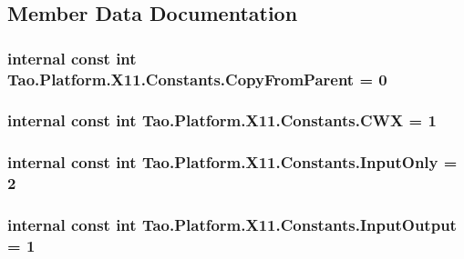 \subsection{Member Data Documentation}
\hypertarget{struct_tao_1_1_platform_1_1_x11_1_1_constants_a05696b30cac01cc03774c5524e23cbfd}{
\subsubsection[{CopyFromParent}]{\setlength{\rightskip}{0pt plus 5cm}internal const int {\bf Tao.Platform.X11.Constants.CopyFromParent} = 0}}
\label{struct_tao_1_1_platform_1_1_x11_1_1_constants_a05696b30cac01cc03774c5524e23cbfd}
\hypertarget{struct_tao_1_1_platform_1_1_x11_1_1_constants_ad50b8f27e32c5c2eabb8f13203dab933}{
\subsubsection[{CWX}]{\setlength{\rightskip}{0pt plus 5cm}internal const int {\bf Tao.Platform.X11.Constants.CWX} = 1}}
\label{struct_tao_1_1_platform_1_1_x11_1_1_constants_ad50b8f27e32c5c2eabb8f13203dab933}
\hypertarget{struct_tao_1_1_platform_1_1_x11_1_1_constants_a6d5fc4dd7bae2fd683224655b3a076e7}{
\subsubsection[{InputOnly}]{\setlength{\rightskip}{0pt plus 5cm}internal const int {\bf Tao.Platform.X11.Constants.InputOnly} = 2}}
\label{struct_tao_1_1_platform_1_1_x11_1_1_constants_a6d5fc4dd7bae2fd683224655b3a076e7}
\hypertarget{struct_tao_1_1_platform_1_1_x11_1_1_constants_a6f3227d40d1193df46290e2551acf852}{
\subsubsection[{InputOutput}]{\setlength{\rightskip}{0pt plus 5cm}internal const int {\bf Tao.Platform.X11.Constants.InputOutput} = 1}}

